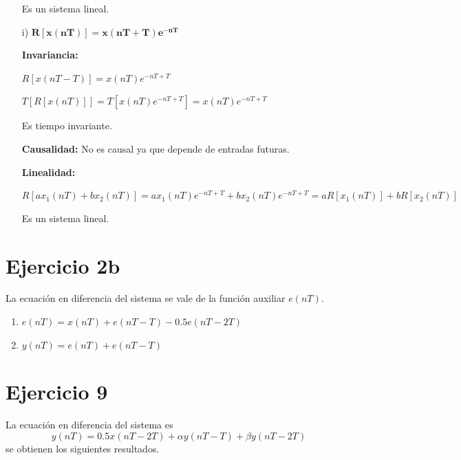 \begin{itemize}
		Es un sistema lineal.
		
	\item[i)] $\mathbf{R \left[ x \left( nT \right) \right] = x \left( nT + T\right) e^{-nT}}$ 
	
		\textbf{Invariancia:}
		
		$R \left[ x \left( nT - T \right) \right] =  x \left( nT \right) e^{-nT + T}$ 
		
		$T \left[ R \left[ x \left( nT \right) \right] \right] = T \left[  x \left( nT \right) e^{-nT + T} \right] = x \left( nT \right) e^{-nT + T}$ 
		
		Es tiempo invariante.
		
		\textbf{Causalidad:} No es causal ya que depende de entradas futuras.
		
		\textbf{Linealidad:}
		
		 $R \left[ ax_1 \left( nT \right) + bx_2 \left( nT \right) \right] = a x_{1} \left( nT \right) e^{-nT + T} + b x_{2} \left( nT \right) e^{-nT + T} = aR \left[ x_1 \left( nT \right) \right] + bR \left[ x_2 \left( nT \right) \right]$

		Es un sistema lineal.		

\end{itemize}

\section*{Ejercicio 2b}
La ecuación en diferencia del sistema se vale de la función auxiliar $e(nT)$.

\begin{enumerate}
	\item	$e(nT) = x(nT) + e(nT - T) - 0.5e(nT - 2T)$
	\item	$y(nT) = e(nT) + e(nT - T)$
\end{enumerate}

\section*{Ejercicio 9}
La ecuación en diferencia del sistema es
\begin{equation*}
	y(nT) = 0.5x(nT - 2T) + \alpha y(nT - T) + \beta y(nT - 2T)
\end{equation*}
se obtienen los siguientes resultados.

